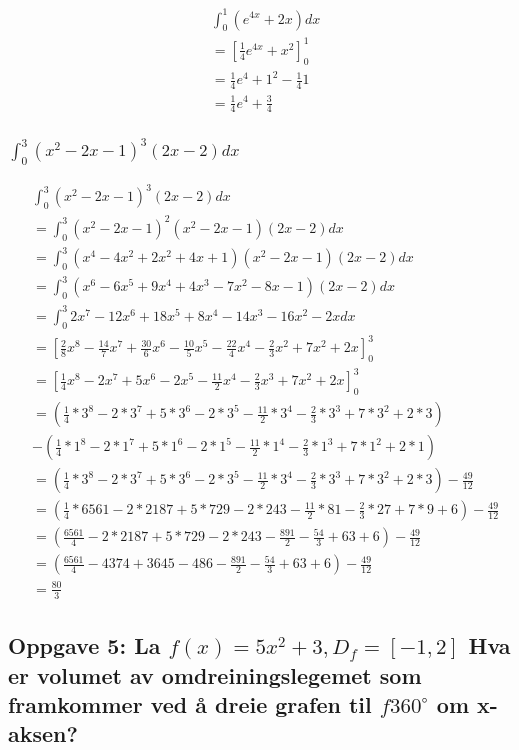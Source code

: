 \documentclass{article}
\begin{document}
\begin{align*}
    & \int_{0}^{1} (e^{4x}+2x) dx \\
    & = [\frac{1}{4} e^{4x} + x^2]^1_0 \\
    &= \frac{1}{4} e^4 + 1^2 - \frac{1}{4}1 \\
    &= \frac{1}{4} e^4 + \frac{3}{4}
\end{align*}

\subsubsection{$\int_{0}^{3} (x^2-2x-1)^3(2x-2) dx$}
     
\begin{align*}
    & \int_{0}^{3} (x^2-2x-1)^3(2x-2) dx \\
    &= \int_{0}^{3} (x^2-2x-1)^2(x^2-2x-1)(2x-2) dx \\
    &= \int_{0}^{3} (x^4-4x^2+2x^2+4x+1)(x^2-2x-1)(2x-2) dx \\
    &= \int_{0}^{3} (x^6-6x^5+9x^4+4x^3-7x^2-8x-1)(2x-2) dx \\
    &= \int_{0}^{3} 2x^7-12x^6+18x^5+8x^4-14x^3-16x^2-2x dx \\
    &= [\frac{2}{8}x^8-\frac{14}{7}x^7+\frac{30}{6}x^6-\frac{10}{5}x^5-\frac{22}{4}x^4-\frac{2}{3}x^2+7x^2+2x]^3_0 \\
    &= [\frac{1}{4}x^8-2x^7+5x^6-2x^5-\frac{11}{2}x^4-\frac{2}{3}x^3+7x^2+2x]^3_0 \\
    &= (\frac{1}{4}*3^8-2*3^7+5*3^6-2*3^5-\frac{11}{2}*3^4-\frac{2}{3}*3^3+7*3^2+2*3) \\
    &- (\frac{1}{4}*1^8-2*1^7+5*1^6-2*1^5-\frac{11}{2}*1^4-\frac{2}{3}*1^3+7*1^2+2*1) \\
    &= (\frac{1}{4}*3^8-2*3^7+5*3^6-2*3^5-\frac{11}{2}*3^4-\frac{2}{3}*3^3+7*3^2+2*3) - \frac{49}{12} \\
    &= (\frac{1}{4}*6561- 2*2187+5*729-2*243-\frac{11}{2}*81-\frac{2}{3}*27+7*9+6) - \frac{49}{12} \\
    &= (\frac{6561}{4}- 2*2187+5*729-2*243-\frac{891}{2}-\frac{54}{3}+63+6) - \frac{49}{12} \\
    &= (\frac{6561}{4}- 4374+3645-486-\frac{891}{2}-\frac{54}{3}+63+6) - \frac{49}{12} \\
    &= \frac{80}{3}
\end{align*}

\subsection{Oppgave 5: La $f(x)=5x^2+3, D_f=[-1, 2]$ Hva er volumet av omdreiningslegemet som framkommer ved å dreie grafen til $f 360^\circ$ om x-aksen?}
\end{document}
